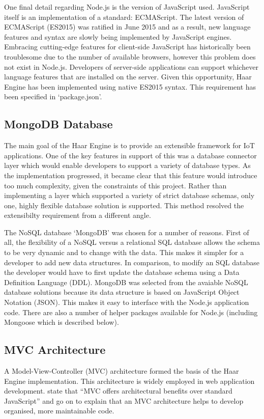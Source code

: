       One final detail regarding Node.js is the version of JavaScript used. JavaScript itself is an implementation of a standard: ECMAScript. The latest version of ECMAScript (ES2015) was ratified in June 2015 \citep{es2015} and as a result, new language features and syntax are slowly being implemented by JavaScript engines. Embracing cutting-edge features for client-side JavaScript has historically been troublesome due to the number of available browsers, however this problem does not exist in Node.js. Developers of server-side applications can support whichever language features that are installed on the server. Given this opportunity, Haar Engine has been implemented using native ES2015 syntax. This requirement has been specified in `package.json'.

    \subsection{MongoDB Database}
      The main goal of the Haar Engine is to provide an extensible framework for IoT applications. One of the key features in support of this was a database connector layer which would enable developers to support a variety of database types. As the implementation progressed, it became clear that this feature would introduce too much complexity, given the constraints of this project. Rather than implementing a layer which supported a variety of strict database schemas, only one, highly flexible database solution is supported. This method resolved the extensibilty requirement from a different angle.

      The NoSQL database `MongoDB' was chosen for a number of reasons. First of all, the flexibility of a NoSQL versus a relational SQL database allows the schema to be very dynamic and to change with the data. This makes it simpler for a developer to add new data structures. In comparison, to modify an SQL database the developer would have to first update the database schema using a Data Definition Language (DDL). MongoDB was selected from the avaiable NoSQL database solutions because its data structure is based on JavaScript Object Notation (JSON). This makes it easy to interface with the Node.js application code. There are also a number of helper packages available for Node.js (including Mongoose which is described below).

    \subsection{MVC Architecture}
      A Model-View-Controller (MVC) architecture formed the basis of the Haar Engine implementation. This architecture is widely employed in web application development. \citet{google-mvc} state that ``MVC offers architectural benefits over standard JavaScript'' and go on to explain that an MVC architecture helps to develop organised, more maintainable code.

